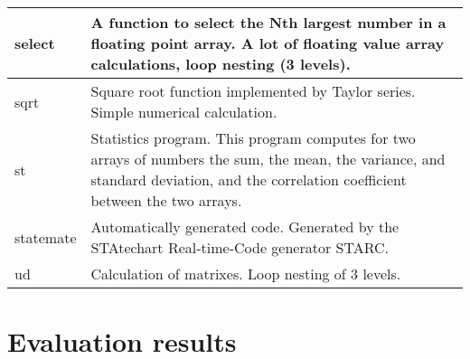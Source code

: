 \documentclass[12pt,twoside,notitlepage]{report}
\begin{document}
\begin{longtable} { p{3cm} p{10cm}}
\midrule
select & A function to select the Nth largest number in a floating point array. A lot of floating value array calculations, loop nesting (3 levels).\\
\midrule
sqrt & Square root function implemented by Taylor series. Simple numerical calculation.\\
\midrule
st & Statistics program. This program computes for two arrays of numbers the sum, the mean, the variance, and standard deviation, and the correlation coefficient between the two arrays.\\
\midrule
statemate & Automatically generated code. Generated by the STAtechart Real-time-Code generator STARC.\\
\midrule
ud & Calculation of matrixes. Loop nesting of 3 levels. \\
  \bottomrule
\end{longtable}

\cleardoublepage

\chapter{Evaluation results}

\begin{sidewaysfigure}[htp]
\centering
\end{sidewaysfigure}
\end{document}
